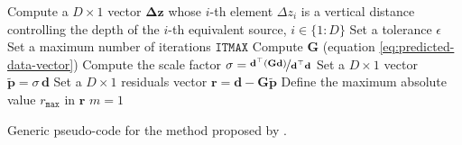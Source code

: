 \documentclass[utf8]{FrontiersinHarvard} %
\begin{document}
	\begin{algorithm}
		\Input{}
		Compute a $D \times 1$ vector $\boldsymbol{\Delta}\mathbf{z}$ whose $i$-th element $\Delta z_{i}$ 
		is a vertical distance controlling the depth of the $i$-th equivalent source, $i \in \{1:D\}$ \;
		Set a tolerance $\epsilon$ \;
		Set a maximum number of iterations $\mathtt{ITMAX}$ \;
		Compute $\mathbf{G}$ (equation \ref{eq:predicted-data-vector}) \;
		Compute the scale factor $\sigma = \nicefrac{\mathbf{d}^{\top} \left( \mathbf{G}\mathbf{d} \right)}{\mathbf{d}^{\top}\mathbf{d}}$\;
		Set a $D \times 1$ vector $\tilde{\mathbf{p}} = \sigma \, \mathbf{d}$ \;
		Set a $D \times 1$ residuals vector $\mathbf{r} = \mathbf{d} - \mathbf{G} \tilde{\mathbf{p}}$ \;
		Define the maximum absolute value $r_{\mathtt{max}}$ in $\mathbf{r}$ \;
		$m = 1$ \;
		\caption{Generic pseudo-code for the method proposed by \cite{cordell1992}.}
		\label{alg:C92}
	\end{algorithm}
	
\end{document}
